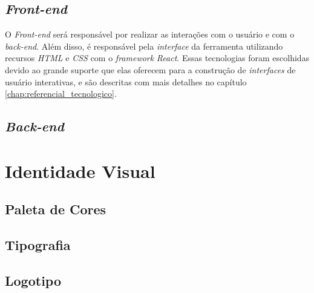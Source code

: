 \subsection{\textit{Front-end}}
O \textit{Front-end} será responsável por realizar as interações com o usuário e com o \textit{back-end}. Além disso, é responsável pela \textit{interface} da ferramenta utilizando recursos \textit{HTML} e \textit{CSS} com o \textit{framework} \textit{React}. Essas tecnologias foram escolhidas devido ao grande suporte que elas oferecem para a construção de \textit{interfaces} de usuário interativas, e são descritas com mais detalhes no capítulo \ref{chap:referencial_tecnologico}.

\subsection{\textit{Back-end}}


\section{Identidade Visual}

\subsection{Paleta de Cores}

\subsection{Tipografia}

\subsection{Logotipo}